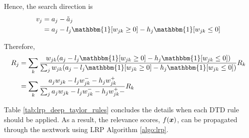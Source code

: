 Hence,  the search direction is 
\begin{align}
	v_j &= a_j - \tilde{a}_j \\
	&=a_j  - l_j \mathbbm{1}[ w_{jk}  \ge 0 ]  - h_j \mathbbm{1}[ w_{jk}  \le 0 ]
\end{align}

Therefore, 
\begin{align}
		R_j &=	\sum_k \frac{ w_{jk}  (a_j  - l_j \mathbbm{1}[ w_{jk}  \ge 0 ]  - h_j \mathbbm{1}[ w_{jk}  \le 0 ]) }{\sum_{j} w_{jk}  (a_j  - l_j \mathbbm{1}[ w_{jk}  \ge 0 ] - h_j \mathbbm{1}[ w_{jk}  \le 0 ]) }  R_k\\
		&=	\sum_k  \frac{ a_j  w_{jk} - l_j w_{jk}^- - h_j w_{jk}^+  }{\sum_{j}   a_j  w_{jk} - l_j w_{jk}^- - h_j w_{jk}^+  -}  R_k
\end{align}





%

Table \ref{tab:lrp_deep_taylor_rules} concludes the details  when each DTD rule should be applied. As a result, the relevance scores, $f(\boldsymbol{x})$, can be propagated through the nextwork using LRP Algorithm \ref{algo:lrp}.


